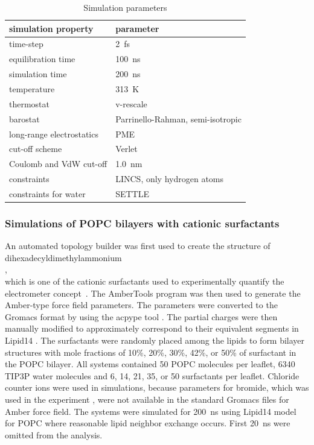 \documentclass[aip,jcp,twocolumn]{revtex4}
\begin{document}
\begin{table}[btp]
  \caption{Simulation parameters}
  \label{tbl:mdpar}
  \begin{tabular}{ll}
    simulation property & parameter   \\
    \hline
    time-step           & 2~fs         \\
    equilibration time  & 100~ns  \\
    simulation time     & 200~ns  \\
    temperature         & 313~K       \\
    thermostat          & v-rescale  \cite{bussi07}   \\
    barostat            & Parrinello-Rahman, semi-isotropic \cite{parrinello81} \\
    long-range electrostatics & PME  \cite{darden93}  \\
    cut-off scheme      & Verlet \cite{Pall13}      \\
    Coulomb and VdW cut-off & 1.0~nm \\
    constraints         & LINCS, only hydrogen atoms \cite{hess97} \\
    constraints for water & SETTLE  \cite{miyamoto92} \\
    \hline
  \end{tabular}
\end{table}


\subsubsection{Simulations of POPC bilayers with cationic surfactants}
An automated topology builder \cite{malde11} was first used to create the structure of
dihexadecyldimethylammonium \\[0.5cm]
 , 
\vspace{0.5cm} \\
which is one of the cationic surfactants used to experimentally quantify the electrometer concept~\cite{scherer89}.
The AmberTools program \cite{amber} was then used to generate the Amber-type force field
parameters. The parameters were converted to the Gromacs format by using
the acpype tool \cite{acpype}. The partial charges were then manually modified
to approximately correspond to their equivalent segments in Lipid14 \cite{dickson14}.
The surfactants were randomly placed among the lipids to form bilayer structures with
mole fractions of 10\%, 20\%, 30\%, 42\%, or 50\% of surfactant in the POPC bilayer.
All systems contained 50 POPC molecules per leaflet, 6340 TIP3P water molecules and
6, 14, 21, 35, or 50 surfactants per leaflet. Chloride counter ions were used
in simulations, because parameters for bromide, which was used in the experiment \cite{scherer89},
were not available in the standard Gromacs files for Amber force field.
The systems were simulated for 200~ns using Lipid14 model for POPC where reasonable lipid neighbor exchange occurs.
First 20~ns were omitted from the analysis. 
\end{document}
